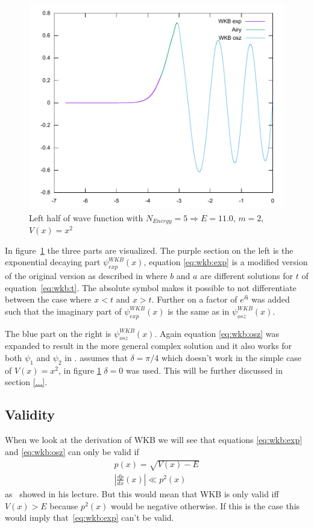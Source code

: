 \documentclass[11pt,DIV=10,final]{scrreprt} %
\newcommand{\mi}{{\text{i}}}
\begin{document}
\begin{figure}[H]\label{fig:wave_parts}
  \centering
  \includegraphics[width=.9\textwidth]{plots/square5half.pdf}
  \caption{Left half of wave function with $N_{Energy} = 5 \Rightarrow E = 11.0$, $m = 2$, $V(x) = x^{2}$}
\end{figure}
In figure~\ref{fig:wave_parts} the three parts are visualized. The purple section on the left is the exponential decaying part $\psi^{WKB}_{exp} (x)$, equation \ref{eq:wkb:exp} is a modified version of the
original version as described in \cite[p. 317, eq. 15.25]{hall2013quantum} where $b$ and $a$ are different solutions for $t$ of equation~\ref{eq:wkb:t}. The absolute symbol makes it possible to not
differentiate between the case where $x < t$ and $x > t$. Further on a factor of $e^{\delta\mi}$ was added such that the imaginary part of $\psi^{WKB}_{exp}(x)$ is the same as in $\psi^{WKB}_{osz}(x)$.

The blue part on the right is $\psi^{WKB}_{osz}(x)$. Again equation \ref{eq:wkb:osz} was expanded to result in the more general complex solution and it also works for both $\psi_{1}$ and $\psi_{2}$ in
\cite[p. 316-317, Claim 15.7]{hall2013quantum}. \cite{hall2013quantum} assumes that $\delta = \pi / 4$ which doesn't work in the simple case of $V(x) = x^{2}$, in figure \ref{fig:wave_parts} $\delta = 0$ was used. This will be further discussed in section \ref{...}.

\subsection{Validity}
When we look at the derivation of WKB we will see that equations \ref{eq:wkb:exp} and \ref{eq:wkb:osz} can only be valid if
\begin{align*}
  p(x) = \sqrt{V(x) - E} \\
  \left|\frac{dp}{dx}(x)\right| \ll p^{2}(x)
\end{align*}
as~\cite{zwiebach2018lecture} showed in his lecture.
But this would mean that WKB is only valid iff $V(x) > E$ because $p^{2}(x)$ would be negative otherwise.
If this is the case this would imply that~\ref{eq:wkb:exp} can't be valid.
\end{document}
